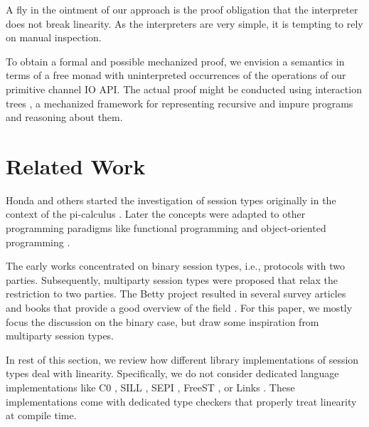 \documentclass[acmsmall,screen]{acmart}
\begin{document}
A fly in the ointment of our approach is the proof obligation that
the interpreter does not break linearity. As the interpreters are very
simple, it is tempting to rely on manual inspection.

To obtain a formal and possible mechanized proof, we envision a
semantics in terms of a free monad
\cite{DBLP:journals/jfp/Swierstra08,DBLP:conf/haskell/KiselyovI15}
with uninterpreted occurrences of 
the operations of our primitive channel IO API. The actual proof might be
conducted using interaction trees
\cite{DBLP:journals/pacmpl/XiaZHHMPZ20}, a mechanized framework for
representing recursive and impure programs and  reasoning about them.

\section{Related Work}
\label{sec:related-work}

Honda and others
\cite{DBLP:conf/concur/Honda93,DBLP:conf/parle/TakeuchiHK94,DBLP:conf/esop/HondaVK98}
started the investigation of session types originally in the context
of the pi-calculus \cite{DBLP:journals/iandc/MilnerPW92a}. Later the concepts were adapted to other programming
paradigms like functional programming
\cite{DBLP:journals/tcs/VasconcelosGR06,DBLP:journals/jfp/GayV10} and
object-oriented programming
\cite{DBLP:conf/europar/RavaraV97,DBLP:journals/corr/abs-1205-5344}. 

The early works concentrated on binary session types, i.e., protocols
with two parties. Subsequently, multiparty session types were
proposed \cite{DBLP:journals/jacm/HondaYC16} that relax the
restriction to two parties. The Betty project resulted in several survey articles
and books that provide a good overview of the field
\cite{gay17:_behav_types,DBLP:journals/csur/HuttelLVCCDMPRT16,DBLP:journals/jlp/BartolettiCDDGP15,DBLP:journals/ftpl/AnconaBB0CDGGGH16}. 
For this paper, we mostly focus the discussion on the binary case, but draw some
inspiration from multiparty session types.



In rest of this section, we review how different library implementations of
session types deal with linearity. Specifically, we do not consider
dedicated language implementations like
C0 \cite{DBLP:journals/corr/WillseyPP17},
SILL \cite{DBLP:conf/esop/ToninhoCP13},
SEPI \cite{DBLP:conf/sefm/FrancoV13},
FreeST \cite{DBLP:journals/iandc/AlmeidaMTV22},
or Links \cite{lindley17:_light_funct_session_types}. These
implementations come with dedicated type checkers that properly treat
linearity at compile time.
\end{document}
